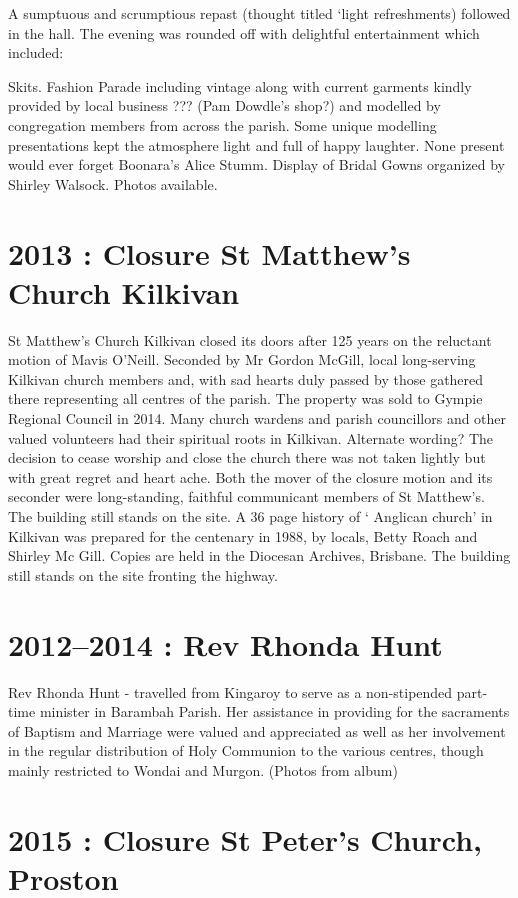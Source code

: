 A sumptuous and scrumptious repast (thought titled `light refreshments)
followed in the hall. The evening was rounded off with delightful
entertainment which included:

Skits. Fashion Parade including vintage along with current garments
kindly provided by local business ??? (Pam Dowdle's shop?) and modelled
by congregation members from across the parish. Some unique modelling
presentations kept the atmosphere light and full of happy laughter. None
present would ever forget Boonara's Alice Stumm. Display of Bridal Gowns
organized by Shirley Walsock. Photos available.

\section{2013 : Closure St Matthew's Church
Kilkivan}

St Matthew's Church Kilkivan closed its doors after 125 years on the
reluctant motion of Mavis O'Neill. Seconded by Mr Gordon McGill, local
long-serving Kilkivan church members and, with sad hearts duly passed by
those gathered there representing all centres of the parish. The
property was sold to Gympie Regional Council in 2014. Many church
wardens and parish councillors and other valued volunteers had their
spiritual roots in Kilkivan. Alternate wording? The decision to cease
worship and close the church there was not taken lightly but with great
regret and heart ache. Both the mover of the closure motion and its
seconder were long-standing, faithful communicant members of St
Matthew's. The building still stands on the site. A 36 page history of `
Anglican church' in Kilkivan was prepared for the centenary in 1988, by
locals, Betty Roach and Shirley Mc Gill. Copies are held in the Diocesan
Archives, Brisbane. The building still stands on the site fronting the
highway.

\section{2012--2014 : Rev Rhonda Hunt}

Rev Rhonda Hunt - travelled from Kingaroy to serve as a non-stipended
part-time minister in Barambah Parish. Her assistance in providing for
the sacraments of Baptism and Marriage were valued and appreciated as
well as her involvement in the regular distribution of Holy Communion to
the various centres, though mainly restricted to Wondai and Murgon.
(Photos from album)

\section{2015 : Closure St Peter's Church,
Proston}

